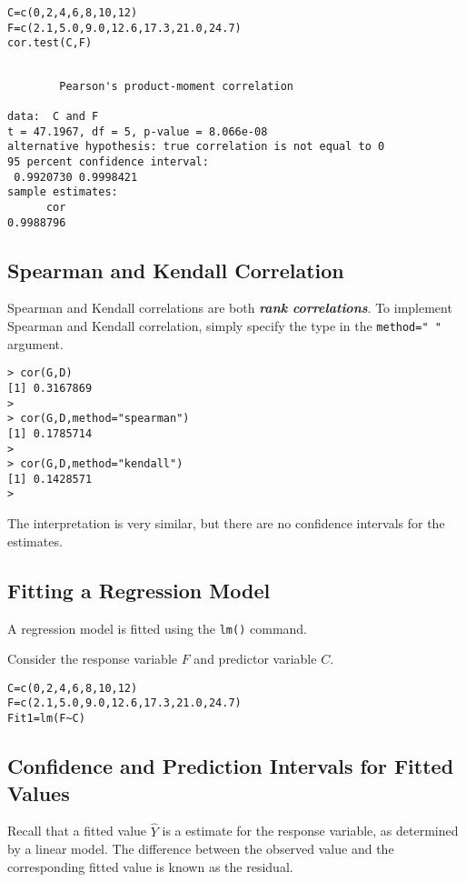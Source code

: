 \begin{framed}
\begin{verbatim}
C=c(0,2,4,6,8,10,12) 
F=c(2.1,5.0,9.0,12.6,17.3,21.0,24.7)
cor.test(C,F)
\end{verbatim}
\end{framed}
\begin{verbatim}

        Pearson's product-moment correlation

data:  C and F 
t = 47.1967, df = 5, p-value = 8.066e-08
alternative hypothesis: true correlation is not equal to 0 
95 percent confidence interval:
 0.9920730 0.9998421 
sample estimates:
      cor 
0.9988796 
\end{verbatim}


\subsection{Spearman and Kendall Correlation}
Spearman and Kendall correlations are both \textbf{\emph{rank correlations}}. 
To implement Spearman and Kendall correlation, simply specify the type in the \texttt{method=" "} argument.
\begin{verbatim}
> cor(G,D)
[1] 0.3167869
>
> cor(G,D,method="spearman")
[1] 0.1785714
>
> cor(G,D,method="kendall")
[1] 0.1428571
> 
\end{verbatim}
The interpretation is very similar, but there are no confidence intervals for the estimates.

\subsection{Fitting a Regression Model}
A regression model is fitted using the \texttt{lm()} command.

Consider the response variable $F$ and predictor variable $C$.
\begin{framed}
\begin{verbatim}
C=c(0,2,4,6,8,10,12) 
F=c(2.1,5.0,9.0,12.6,17.3,21.0,24.7)
Fit1=lm(F~C)
\end{verbatim}
\end{framed}


\subsection{Confidence and Prediction Intervals for Fitted Values} 

Recall that a fitted value $\hat{Y}$ is a estimate for the response variable, as determined by a linear model. The difference between the observed value and the corresponding fitted value is known as the residual.

